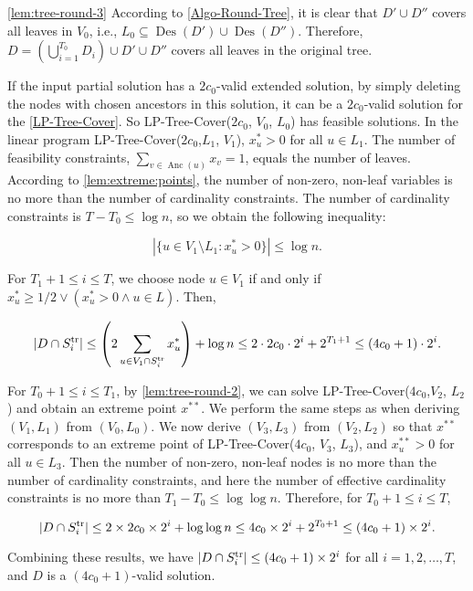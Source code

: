 \documentclass[11pt,a4paper]{article} \usepackage{enumitem}
\newcommand{\trS}[1]{\ifx\relax#1\relax
    S^{\operatorname{tr}} \else
    S^{\operatorname{tr}}_{#1} \fi
}
\newcommand{\Des}{\operatorname{Des}}
\newcommand{\Anc}{\operatorname{Anc}}
\theoremstyle{definition}
\begin{document}
\begin{proofoflem}{\ref{lem:tree-round-3}}
According to \cref{Algo-Round-Tree}, it is clear that $D' \cup D''$ covers all leaves in $V_0$, i.e., $L_0 \subseteq \Des(D') \cup \Des(D'')$. Therefore, $D = \left(\bigcup_{i=1}^{T_0} D_i\right) \cup D' \cup D''$ covers all leaves in the original tree.

If the input partial solution has a $2c_0$-valid extended solution, by simply deleting the nodes with chosen ancestors in this solution, it can be a $2c_0$-valid solution for the \ref{LP-Tree-Cover}. So LP-Tree-Cover($2c_0$, $V_0$, $L_0$) has feasible solutions. In the linear program LP-Tree-Cover($2c_0$,$L_1$, $V_1$), $x^{*}_u > 0$ for all $u \in L_1$. The number of feasibility constraints, $\sum_{v \in \Anc(u)} x_v = 1$, equals the number of leaves. According to  \cref{lem:extreme:points}, the number of non-zero, non-leaf variables is no more than the number of cardinality constraints. The number of cardinality constraints is $T - T_0 \leq \log n$, so we obtain the following inequality:

$$|\{u \in V_1 \setminus L_1 : x^{*}_u > 0\}| \leq \log n.$$  

For $T_1 + 1 \leq i \leq T$, we choose node $u \in V_1$ if and only if $x^{*}_u \geq 1/2 \lor (x^{*}_u > 0 \land u \in L)$. Then,

$$|D \cap \trS{i}| \leq \left( 2 \sum_{u \in V_1 \cap \trS{i}} x^{*}_u \right) + \log n \leq 2 \cdot 2c_0 \cdot 2^i + 2^{T_1 + 1} \leq (4c_0 + 1) \cdot 2^i.$$

For $T_0 + 1 \leq i \leq T_1$, by \cref{lem:tree-round-2}, we can solve LP-Tree-Cover($4c_0$,$V_2$, $L_2$) and obtain an extreme point $x^{**}$. We perform the same steps as when deriving $(V_1, L_1)$ from $(V_0, L_0)$. We now derive $(V_3, L_3)$ from $(V_2, L_2)$ so that $x^{**}$ corresponds to an extreme point of LP-Tree-Cover($4c_0$, $V_3$, $L_3$), and $x^{**}_u > 0$ for all $u \in L_3$. Then the number of non-zero, non-leaf nodes is no more than the number of cardinality constraints, and here the number of effective cardinality constraints is no more than $T_1 - T_0\le \log\log n$. Therefore, for $T_0 + 1 \leq i \leq T$,

$$|D \cap \trS{i}| \leq 2 \times 2c_0 \times 2^i + \log\log n \leq 4c_0 \times 2^i + 2^{T_0+1} \leq (4c_0 + 1) \times 2^i.$$

Combining these results, we have $|D \cap \trS{i}| \leq (4c_0 + 1) \times 2^i$ for all $i = 1, 2, \dots, T$, and $D$ is a $(4c_0 + 1)$-valid solution.
\end{proofoflem}
\end{document}
